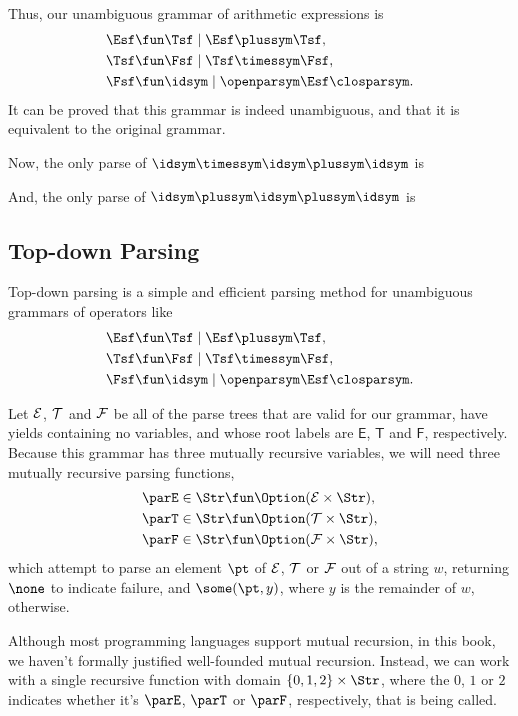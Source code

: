 Thus, our unambiguous grammar of arithmetic expressions is
\begin{align*}
\Esf &\fun \Tsf \mid \Esf\plussym\Tsf , \\
\Tsf &\fun \Fsf \mid \Tsf\timessym\Fsf , \\
\Fsf &\fun \idsym \mid \openparsym\Esf\closparsym .
\end{align*}
It can be proved that this grammar is indeed unambiguous, and that it
is equivalent to the original grammar.

Now, the only parse of $\idsym\timessym\idsym\plussym\idsym$ is
\begin{center}

\end{center}
And, the only parse of $\idsym\plussym\idsym\plussym\idsym$
is
\begin{center}

\end{center}

\subsection{Top-down Parsing}

Top-down parsing is a simple and efficient parsing method for
unambiguous grammars of operators like
\begin{align*}
\Esf &\fun \Tsf \mid \Esf\plussym\Tsf , \\
\Tsf &\fun \Fsf \mid \Tsf\timessym\Fsf , \\
\Fsf &\fun \idsym \mid \openparsym\Esf\closparsym .
\end{align*}

Let $\cal E$, $\cal T$ and $\cal F$ be all of the parse trees that
are valid for our grammar, have yields containing no variables,
and whose root labels are $\mathsf{E}$, $\mathsf{T}$ and $\mathsf{F}$, 
respectively.
Because this grammar has three mutually recursive variables, we
will need three mutually recursive parsing functions,
\begin{align*}
\parE &\in \Str\fun\Option({\cal E}\times\Str) , \\
\parT &\in \Str\fun\Option({\cal T}\times\Str) , \\
\parF &\in \Str\fun\Option({\cal F}\times\Str) ,
\end{align*}
which attempt to parse an element $\pt$ of $\cal E$, $\cal T$ or $\cal
F$ out of a string $w$, returning $\none$ to indicate failure, and
$\some(\pt,y)$, where $y$ is the remainder of $w$, otherwise.

Although most programming languages support mutual recursion, in this
book, we haven't formally justified well-founded mutual recursion.  
Instead, we can work with a single recursive function with domain
$\{0,1,2\}\times\Str$, where the $0$, $1$ or $2$ indicates whether
it's $\parE$, $\parT$ or $\parF$, respectively, that is being called.

